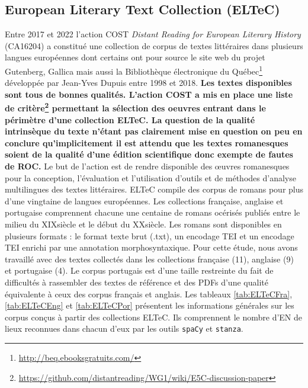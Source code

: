 \subsection{European Literary Text Collection (ELTeC)}

Entre 2017 et 2022 l'action COST \textit{Distant Reading for European Literary History} (CA16204) a constitué une collection de corpus de textes littéraires dans plusieurs langues européennes dont certains ont pour source le site web du projet Gutenberg, Gallica mais aussi la Bibliothèque électronique du Québec\footnote{\url{http://beq.ebooksgratuits.com/}} développée par Jean-Yves Dupuis entre 1998 et 2018. \textbf{Les textes disponibles sont tous de bonnes qualités. L'action COST a mis en place une liste de critère\footnote{\url{https://github.com/distantreading/WG1/wiki/E5C-discussion-paper}} permettant la sélection des oeuvres entrant dans le périmètre d'une collection ELTeC. La question de la qualité intrinsèque du texte n'étant pas clairement mise en question on peu en conclure qu'implicitement il est attendu que les textes romanesques soient de la qualité d'une édition scientifique donc exempte de fautes de ROC.} Le but de l'action est de rendre disponible des œuvres romanesques pour la conception, l'évaluation et l'utilisation d'outils et de méthodes d'analyse multilingues des textes littéraires. ELTeC compile des corpus de romans pour plus d'une vingtaine de langues européennes. Les collections française, anglaise et portugaise comprennent chacune une centaine de romans océrisés publiés entre le milieu du XIX\ieme{}siècle et le début du XX\ieme{}siècle. Les romans sont disponibles en plusieurs formats : le format texte brut (.txt), un encodage TEI et un encodage TEI enrichi par une annotation morphosyntaxique.
Pour cette étude, nous avons travaillé avec des textes collectés dans les collections française (11), anglaise (9) et portugaise (4). Le corpus portugais est d'une taille restreinte du fait de difficultés à rassembler des textes de référence et des PDFs d'une qualité équivalente à ceux des corpus français et anglais. Les tableaux \ref{tab:ELTeCFra}, \ref{tab:ELTeCEng} et \ref{tab:ELTeCPor} présentent les informations générales sur les corpus conçus à partir des collections ELTeC. Ils comprennent le nombre d'EN de lieux reconnues dans chacun d'eux par les outils \texttt{spaCy} et \texttt{stanza}.


